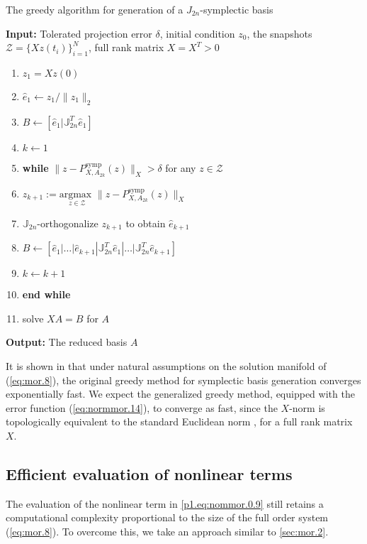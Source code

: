 \begin{algorithm} 
\caption{The greedy algorithm for generation of a $J_{2n}$-symplectic basis} \label{alg:2}
{\bf Input:} Tolerated projection error $\delta$, initial condition $ z_0$, the snapshots $\mathcal Z = \{Xz(t_i)\}_{i=1}^{N}$, full rank matrix $X=X^T>0$
\begin{enumerate}
\item $z_1 = Xz(0)$
\item $\hat e_1 \leftarrow z_1/ \| z_1 \|_2$
\item $B \leftarrow [\hat e_1| \mathbb J_{2n}^T \hat e_1]$
\item $k \leftarrow 1$
\item \textbf{while} $\| z - P^{\text{symp}}_{X,A_{2k}}(z)\|_X > \delta$ for any $z \in \mathcal Z$
\item \hspace{0.5cm} $z_{k+1} := \underset{z\in \mathcal Z}{\text{argmax }} \| z - P^{\text{symp}}_{X,A_{2k}}(z)\|_X$
\item \hspace{0.5cm} $\mathbb J_{2n}$-orthogonalize $z_{k+1}$ to obtain $\hat e_{k+1}$
\item \hspace{0.5cm} $B \leftarrow [\hat e_1|\dots |\hat e_{k+1} | \mathbb J_{2n}^T \hat e_1|\dots| \mathbb J_{2n}^T  \hat e_{k+1}]$
\item \hspace{0.5cm} $k \leftarrow k+1$
\item \textbf{end while}
\item solve $X A = B$ for $A$
\end{enumerate}
\vspace{0.5cm}
{\bf Output:} The reduced basis $A$
\end{algorithm}
It is shown in \cite{doi:10.1137/17M1111991} that under natural assumptions on the solution manifold of (\ref{eq:mor.8}), the original greedy method for symplectic basis generation converges exponentially fast. We expect the generalized greedy method, equipped with the error function (\ref{eq:normmor.14}), to converge as fast, since the $X$-norm is topologically equivalent to the standard Euclidean norm \cite{friedman1970foundations}, for a full rank matrix $X$.

\subsection{Efficient evaluation of nonlinear terms} \label{sec:normmor.3}
The evaluation of the nonlinear term in \eqref{p1.eq:nommor.0.9} still retains a computational complexity proportional to the size of the full order system (\ref{eq:mor.8}). To overcome this, we take an approach similar to \cref{sec:mor.2}. 

